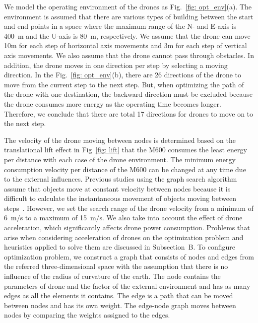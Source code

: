 \documentclass[journal]{./template/IEEEtran}
\begin{document}
We model the operating environment of the drones as Fig.~\ref{fig: opt_env}(a).
The environment is assumed that there are various types of building between the start and end points in a space where the maximum range of the N- and E-axis is 400~m and the U-axis is 80~m, respectively.
We assume that the drone can move 10m for each step of horizontal axis movements and 3m for each step of vertical axis movements. We also assume that the drone cannot pass through obstacles. In addition, the drone moves in one direction per step by selecting a moving direction.
In the Fig.~\ref{fig: opt_env}(b), there are 26 directions of the drone to move from the current step to the next step.
But, when optimizing the path of the drone with one destination, the backward direction must be excluded because the drone consumes more energy as the operating time becomes longer. Therefore, we conclude that there are total 17 directions for drones to move on to the next step.

The velocity of the drone moving between nodes is determined based on the translational lift effect in Fig~\ref{fig: lift} that the M600 consumes the least energy per distance with each case of the drone environment. 
The minimum energy consumption velocity per distance of the M600 can be changed at any time due to the external influences.  
Previous studies using the graph search algorithm assume that objects move at constant velocity between nodes because it is difficult to calculate the instantaneous movement of objects moving between steps~\cite{ref_8, ref_10, ref_22}. 
However, we set the search range of the drone velocity from a minimum of 6~m/s to a maximum of 15~m/s. We also take into account the effect of drone acceleration, which significantly affects drone power consumption.
Problems that arise when considering acceleration of drones on the optimization problem and heuristics applied to solve them are discussed in Subsection~B.
To configure optimization problem, we construct a graph that consists of nodes and edges from the referred three-dimensional space with the assumption that there is no influence of the radius of curvature of the earth.
The node contains the parameters of drone and the factor of the external environment and has as many edges as all the elements it contains. 
The edge is a path that can be moved between nodes and has its own weight. The edge-node graph moves between nodes by comparing the weights assigned to the edges.  
\end{document}
